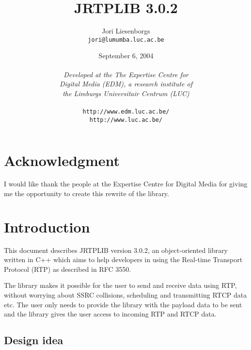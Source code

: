 \documentclass[12pt,a4paper]{article}
\newcommand{\jversion}{3.0.2}
\begin{document}
	\title{\ \vspace{3.5cm}\ \\{\bf JRTPLIB \jversion}}
	\author{Jori Liesenborgs\\{\tt jori@lumumba.luc.ac.be}}
	\date{September 6, 2004\\\vspace{0.5cm}\ \\
	      {\small{\em Developed at the The Expertise Centre for \\Digital Media (EDM),
	      a research institute of\\ the Limburgs Universitair Centrum (LUC)}\\\ \\
		  {\tt http://www.edm.luc.ac.be/}\\
		  {\tt http://www.luc.ac.be/}}}
	\maketitle
	
	\newpage
	\tableofcontents

\setlength{\parindent}{0cm}
\setlength{\parskip}{0.3cm}

	\newpage
	\section*{Acknowledgment}

		I would like thank the people at the Expertise Centre for Digital Media
		for giving me the opportunity to create this rewrite of the library.

	\newpage
	\section{Introduction}

		This document describes JRTPLIB version \jversion, an object-oriented
		library written in C++ which aims to help developers in using the 
		Real-time Transport Protocol (RTP) as described in RFC 3550.

		The library makes it possible for the user to send and receive data
		using RTP, without worrying about SSRC collisions, scheduling and
		transmitting RTCP data etc. The user only needs to provide the library
		with the payload data to be sent and the library gives the user access
		to incoming RTP and RTCP data.

		\subsection{Design idea}
\end{document}
